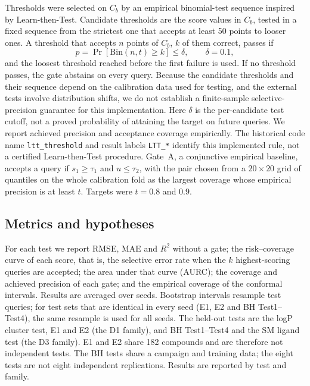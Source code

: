 \documentclass[11pt,letterpaper]{article}
\begin{document}
Thresholds were selected on $C_b$ by an empirical binomial-test sequence inspired by Learn-then-Test.\cite{angelopoulos2021} Candidate thresholds are the score values in $C_b$, tested in a fixed sequence from the strictest one that accepts at least 50 points to looser ones. A threshold that accepts $n$ points of $C_b$, $k$ of them correct, passes if
\begin{equation}
p = \Pr\left[\mathrm{Bin}(n, t) \ge k\right] \le \delta, \qquad \delta = 0.1,
\end{equation}
and the loosest threshold reached before the first failure is used. If no threshold passes, the gate abstains on every query. Because the candidate thresholds and their sequence depend on the calibration data used for testing, and the external tests involve distribution shifts, we do not establish a finite-sample selective-precision guarantee for this implementation. Here $\delta$ is the per-candidate test cutoff, not a proved probability of attaining the target on future queries. We report achieved precision and acceptance coverage empirically. The historical code name \texttt{ltt\_threshold} and result labels \texttt{LTT\_*} identify this implemented rule, not a certified Learn-then-Test procedure. Gate~A, a conjunctive empirical baseline, accepts a query if $s_1 \ge \tau_1$ and $u \le \tau_2$, with the pair chosen from a $20\times20$ grid of quantiles on the whole calibration fold as the largest coverage whose empirical precision is at least $t$. Targets were $t = 0.8$ and $0.9$.

\subsection{Metrics and hypotheses}
\label{sec:hypotheses}

For each test we report RMSE, MAE and $R^2$ without a gate; the risk--coverage curve of each score, that is, the selective error rate when the $k$ highest-scoring queries are accepted; the area under that curve (AURC); the coverage and achieved precision of each gate; and the empirical coverage of the conformal intervals. Results are averaged over seeds. Bootstrap intervals resample test queries; for test sets that are identical in every seed (E1, E2 and BH Test1--Test4), the same resample is used for all seeds. The held-out tests are the logP cluster test, E1 and E2 (the D1 family), and BH Test1--Test4 and the SM ligand test (the D3 family). E1 and E2 share 182 compounds and are therefore not independent tests. The BH tests share a campaign and training data; the eight tests are not eight independent replications. Results are reported by test and family.
\end{document}

